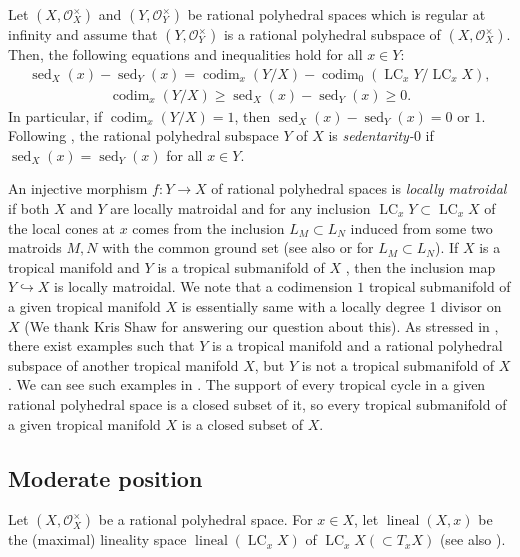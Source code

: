 \documentclass[a4paper,dvipdfmx,reqno,12pt]{amsart}
\theoremstyle{definition}
\newcommand{\opn}[1]{\operatorname{#1}}
\newcommand{\hookto}{\hookrightarrow}
\numberwithin{equation}{section}
\begin{document}
Let $(X,\mathcal{O}_X^{\times})$ and 
$(Y,\mathcal{O}_Y^{\times})$ be rational
polyhedral spaces which is regular at infinity and
assume that $(Y,\mathcal{O}_Y^{\times})$
is a rational polyhedral subspace of
$(X,\mathcal{O}_X^{\times})$. 
Then, the following equations and inequalities hold
for all $x\in Y$:
\begin{align}
\opn{sed}_X(x)-\opn{sed}_Y(x)=
\opn{codim}_x(Y/X)-\opn{codim}_0(\opn{LC}_x Y/\opn{LC}_xX),
\end{align}
\begin{align}
\opn{codim}_x(Y/X) \geq 
\opn{sed}_X(x)-\opn{sed}_Y(x)\geq 0.
\end{align}
In particular, if $\opn{codim}_x(Y/X)=1$,
then $\opn{sed}_X(x)-\opn{sed}_Y(x)=0$ or $1$.
Following \cite[]{demedrano2023chern},
the rational polyhedral subspace $Y$ of $X$ is
\emph{sedentarity-$0$} if
$\opn{sed}_X(x)=\opn{sed}_Y(x)$ for all
$x\in Y$.



An injective morphism $f\colon Y\to X$ of rational polyhedral spaces
is \emph{locally matroidal} if both $X$ and $Y$ are locally matroidal
and for any inclusion $\opn{LC}_x Y\subset \opn{LC}_x X$ of
the local cones at $x$ comes from the inclusion
$L_M\subset L_N$ induced from some two matroids $M,N$ with
the common ground set
(see also \cite[]{MR3041763} or \cite[]{MR3032930}
for $L_M\subset L_N$).  
If $X$ is a tropical manifold and $Y$ is a tropical submanifold of $X$
\cite[Definition 2.14]{demedrano2023chern},
then the inclusion map $Y\hookto X$ is locally matroidal. 
We note that a codimension $1$ tropical submanifold of a given
tropical manifold $X$ is essentially same with
a locally degree 1 divisor on $X$
\cite[Definition 4.3]{shaw2015tropical}
(We thank Kris Shaw for answering our question about this).
As stressed in \cite[Example 2.15]{demedrano2023chern},
there exist examples such that $Y$ is a tropical manifold and
a rational polyhedral subspace of another tropical manifold
$X$, but $Y$ is not a tropical submanifold of $X$.
We can see such examples in \cite{MR2594592,MR3339531,shaw2015tropical}.
The support of every tropical cycle in a given
rational polyhedral space is
a closed subset of it,
so every tropical submanifold of a given
tropical manifold $X$ is a closed subset of $X$.

\subsection{Moderate position}
Let $(X,\mathcal{O}_X^{\times})$ be a rational polyhedral space.
For $x\in X$, let 
$\opn{lineal}(X,x)$ be the (maximal) lineality space
$\opn{lineal}(\opn{LC}_x X)$ of 
$\opn{LC}_x X (\subset T_x X)$ \cite[]{MR4246795}
(see also \cite[]{demedrano2023chern}).
\end{document}
